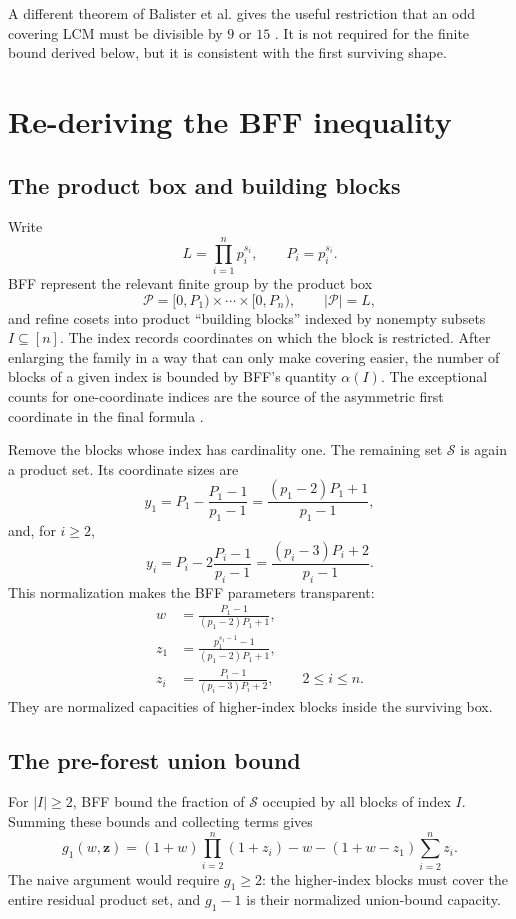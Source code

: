 \documentclass[11pt]{article}
\theoremstyle{definition}
\begin{document}
A different theorem of Balister et al. gives the useful restriction that an odd covering LCM
must be divisible by $9$ or $15$ \cite{BalisterDensity2022}.  It is not required for the
finite bound derived below, but it is consistent with the first surviving shape.

\section{Re-deriving the BFF inequality}\label{sec:bff}

\subsection{The product box and building blocks}

Write
\[
 L=\prod_{i=1}^{n}p_i^{s_i},\qquad P_i=p_i^{s_i}.
\]
BFF represent the relevant finite group by the product box
\[
 \mathcal P=[0,P_1)\times\cdots\times[0,P_n),
 \qquad |\mathcal P|=L,
\]
and refine cosets into product ``building blocks'' indexed by nonempty subsets
$I\subseteq[n]$.  The index records coordinates on which the block is restricted.
After enlarging the family in a way that can only make covering easier, the number of
blocks of a given index is bounded by BFF's quantity $\alpha(I)$.  The exceptional counts
for one-coordinate indices are the source of the asymmetric first coordinate in the final
formula \cite{BFF1987}.

Remove the blocks whose index has cardinality one.  The remaining set $\mathcal S$ is again a
product set.  Its coordinate sizes are
\[
 y_1=P_1-\frac{P_1-1}{p_1-1}
     =\frac{(p_1-2)P_1+1}{p_1-1},
\]
and, for $i\ge2$,
\[
 y_i=P_i-2\frac{P_i-1}{p_i-1}
     =\frac{(p_i-3)P_i+2}{p_i-1}.
\]
This normalization makes the BFF parameters transparent:
\begin{align}
 w&=\frac{P_1-1}{(p_1-2)P_1+1},\\
 z_1&=\frac{p_1^{s_1-1}-1}{(p_1-2)P_1+1},\\
 z_i&=\frac{P_i-1}{(p_i-3)P_i+2},\qquad 2\le i\le n.
\end{align}
They are normalized capacities of higher-index blocks inside the surviving box.

\subsection{The pre-forest union bound}

For $|I|\ge2$, BFF bound the fraction of $\mathcal S$ occupied by all blocks of index $I$.
Summing these bounds and collecting terms gives
\begin{equation}\label{eq:g1}
 g_1(w,\mathbf z)
 =(1+w)\prod_{i=2}^{n}(1+z_i)-w
 -(1+w-z_1)\sum_{i=2}^{n}z_i.
\end{equation}
The naive argument would require $g_1\ge2$: the higher-index blocks must cover the entire
residual product set, and $g_1-1$ is their normalized union-bound capacity.
\end{document}
